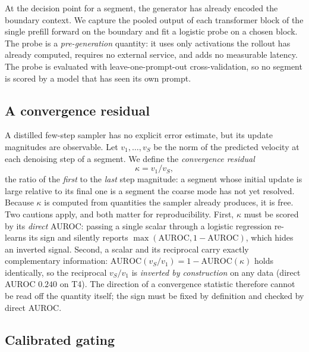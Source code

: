 \documentclass[review]{cas-sc}          %
\begin{document}
At the decision point for a segment, the generator has already encoded the boundary context. We capture
the pooled output of each transformer block of the single prefill forward on the boundary and fit a
logistic probe on a chosen block. The probe is a \emph{pre-generation} quantity: it uses only activations
the rollout has already computed, requires no external service, and adds no measurable latency. The probe
is evaluated with leave-one-prompt-out cross-validation, so no segment is scored by a model that has seen
its own prompt.

\subsection{A convergence residual}
\label{sec:crv}

A distilled few-step sampler has no explicit error estimate, but its update magnitudes are observable.
Let $v_1, \dots, v_S$ be the norm of the predicted velocity at each denoising step of a segment. We define
the \emph{convergence residual}
\begin{equation}
\kappa = v_1 / v_S ,
\label{eq:kappa}
\end{equation}
the ratio of the \emph{first} to the \emph{last} step magnitude: a segment whose initial update is large
relative to its final one is a segment the coarse mode has not yet resolved. Because $\kappa$ is computed
from quantities the sampler already produces, it is free. Two cautions apply, and both matter for
reproducibility. First, $\kappa$ must be scored by its \emph{direct} AUROC: passing a single scalar
through a logistic regression re-learns its sign and silently reports $\max(\text{AUROC}, 1-\text{AUROC})$,
which hides an inverted signal. Second, a scalar and its reciprocal carry exactly complementary
information: $\mathrm{AUROC}(v_S/v_1) = 1 - \mathrm{AUROC}(\kappa)$ holds identically, so the reciprocal
$v_S/v_1$ is \emph{inverted by construction} on any data (direct AUROC $0.240$ on T4). The direction of a
convergence statistic therefore cannot be read off the quantity itself; the sign must be fixed by
definition and checked by direct AUROC.

\subsection{Calibrated gating}
\label{sec:gate}
\end{document}
